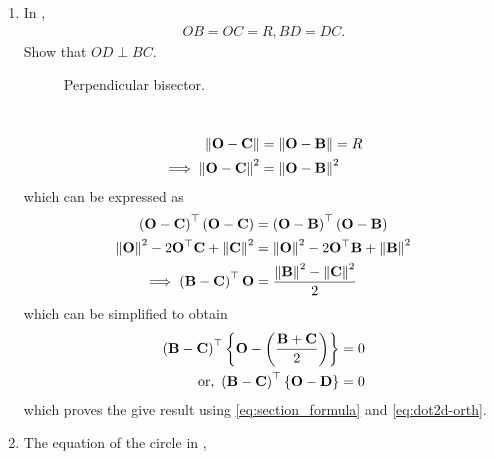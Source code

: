 \begin{enumerate}[label=\thesection.\arabic*.,ref=\thesection.\theenumi]
%
\item In 
	\label{prob:tri-ccentre-def}
	, 
\begin{align}
OB = OC=R, 	BD = DC.
\end{align}
Show that $OD \perp BC$.
%
\begin{figure}[!ht]
	\begin{center}
		
		\resizebox{\columnwidth}{!}{}
	\end{center}
	\caption{Perpendicular bisector.}
	\label{fig:tri-perp-bis}	
\end{figure}
\\
\solution 
\begin{align}
	\left\lVert\mathbf{O}-\mathbf{C}\right\rVert &=
\left\lVert\mathbf{O}-\mathbf{B}\right\rVert =R
\\
	\implies \left\lVert\mathbf{O}-\mathbf{C}\right\rVert^2 &=
\left\lVert\mathbf{O}-\mathbf{B}\right\rVert^2 
\end{align}
which can be expressed as 
\begin{align}
	\left(\mathbf{O}-\mathbf{C}\right)^{\top} \left(\mathbf{O}-\mathbf{C}\right)&=
	\left(\mathbf{O}-\mathbf{B}\right)^{\top} 
\left(\mathbf{O}-\mathbf{B}\right)
\\
\left\lVert\mathbf{O}\right\rVert^2-2{\mathbf{O}}^{\top}\mathbf{C} + \left\lVert\mathbf{C}\right\rVert^2
	&= \left\lVert\mathbf{O}\right\rVert^2-2{\mathbf{O}}^{\top}\mathbf{B} + \left\lVert\mathbf{B}\right\rVert^2
	\\
	\implies 
	  \left(\mathbf{B}-\mathbf{C}\right)^{\top}{\mathbf{O}} 
	  &=  \frac{\left\lVert\mathbf{B}\right\rVert^2 - \left\lVert\mathbf{C}\right\rVert^2}{2}
\end{align}
which can be simplified to obtain
  \begin{align}
	  \brak{\vec{B}-\vec{C}}^{\top}\cbrak{{\vec{O}}- 
	    \brak{\frac{{\vec{B}} + {\vec{C}}}{2}}}=0
  \label{eq:norm2d_equidist}
  \\
	  \text{or, }
	  \brak{\vec{B}-\vec{C}}^{\top}\cbrak{{\vec{O}}- \vec{D}}=0
  \end{align}
  which proves the give result using 
	  \eqref{eq:section_formula}
	  and 
  \eqref{eq:dot2d-orth}.
  \item The equation  of the circle in 
	,

\end{enumerate}
